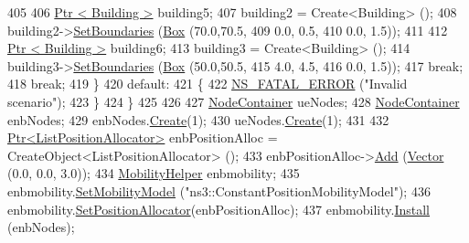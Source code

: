 \begin{DoxyCode}
405 
406                         \hyperlink{classns3_1_1Ptr}{Ptr < Building >} building5;
407                         building2 = Create<Building> ();
408                         building2->\hyperlink{classns3_1_1Building_a4b69659f05a983f06e33e7db62415915}{SetBoundaries} (\hyperlink{classns3_1_1Box}{Box} (70.0,70.5,
409                                                                                 0.0, 0.5,
410                                                                                 0.0, 1.5));
411 
412                         \hyperlink{classns3_1_1Ptr}{Ptr < Building >} building6;
413                         building3 = Create<Building> ();
414                         building3->\hyperlink{classns3_1_1Building_a4b69659f05a983f06e33e7db62415915}{SetBoundaries} (\hyperlink{classns3_1_1Box}{Box} (50.0,50.5,
415                                                                                 4.0, 4.5,
416                                                                                 0.0, 1.5));
417                         \textcolor{keywordflow}{break};
418                         \textcolor{keywordflow}{break};
419                 \}
420                 \textcolor{keywordflow}{default}:
421                 \{
422                     \hyperlink{group__fatal_ga5131d5e3f75d7d4cbfd706ac456fdc85}{NS\_FATAL\_ERROR} (\textcolor{stringliteral}{"Invalid scenario"});
423                 \}
424         \}
425 
426 
427         \hyperlink{classns3_1_1NodeContainer}{NodeContainer} ueNodes;
428         \hyperlink{classns3_1_1NodeContainer}{NodeContainer} enbNodes;
429         enbNodes.\hyperlink{classns3_1_1NodeContainer_a787f059e2813e8b951cc6914d11dfe69}{Create}(1);
430         ueNodes.\hyperlink{classns3_1_1NodeContainer_a787f059e2813e8b951cc6914d11dfe69}{Create}(1);
431 
432         \hyperlink{classns3_1_1Ptr}{Ptr<ListPositionAllocator>} enbPositionAlloc = 
      CreateObject<ListPositionAllocator> ();
433         enbPositionAlloc->\hyperlink{classns3_1_1ListPositionAllocator_a460e82f015ac012a73ba0ea0cccb3486}{Add} (\hyperlink{classns3_1_1Vector3D_a7e59b47bc94c9cb1dadff68c1d0112d8}{Vector} (0.0, 0.0, 3.0));
434         \hyperlink{classns3_1_1MobilityHelper}{MobilityHelper} enbmobility;
435         enbmobility.\hyperlink{classns3_1_1MobilityHelper_a030275011b6f40682e70534d30280aba}{SetMobilityModel} (\textcolor{stringliteral}{"ns3::ConstantPositionMobilityModel"});
436         enbmobility.\hyperlink{classns3_1_1MobilityHelper_ac59d5295076be3cc11021566713a28c5}{SetPositionAllocator}(enbPositionAlloc);
437         enbmobility.\hyperlink{classns3_1_1MobilityHelper_a07737960ee95c0777109cf2994dd97ae}{Install} (enbNodes);

\end{DoxyCode}
